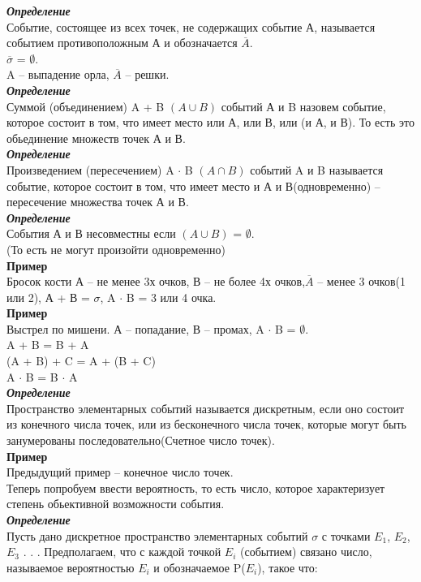 \documentclass[russian, 12pt]{article}
\begin{document}
\textit{\textbf{Определение}}\\ Событие, состоящее из всех точек, не содержащих событие А, называется событием противоположным А и обозначается $\overline{A}$.\\
$\overline{\sigma}$ = $\emptyset$.\\
A -- выпадение орла, $\overline{A}$ -- решки.\\
\textit{\textbf{Определение}}\\ Суммой (объединением)  A + B $(A \cup B)$ событий А и B назовем событие, которое состоит в том, что имеет место или А, или В, или (и А, и В). То есть это обьединение множеств точек А и В.\\
\textit{\textbf{Определение}}\\Произведением (пересечением) A $\cdot$ B $(A \cap B)$ событий A и B называется событие, которое состоит в том, что имеет место и А и В(одновременно) -- пересечение множества точек А и В.\\
\textit{\textbf{Определение}} \\События А и В несовместны если $(A \cup B)$ =  $\emptyset$.\\
(То есть не могут произойти одновременно)\\
\textbf{Пример\\}Бросок кости А -- не менее 3х очков, В -- не более 4х очков,$\overline{A}$ -- менее 3 очков(1 или 2), А + В = {$\sigma$}, A $\cdot$ B = 3 или 4 очка.\\
\textbf{Пример}\\Выстрел по мишени. А -- попадание, В -- промах,  A $\cdot$ B = $\emptyset$.\\
A + B = B + A\\
(A + B) + C = A + (B + C)\\
A $\cdot$ B = B  $\cdot$ A\\
\textit{\textbf{Определение}}\\Пространство элементарных событий называется дискретным, если оно состоит из конечного числа точек, или из бесконечного числа точек, которые могут быть занумерованы последовательно(Счетное число точек).\\
\textbf{Пример}\\Предыдущий пример -- конечное число точек.\\
Теперь попробуем ввести вероятность, то есть число, которое характеризует степень обьективной возможности события.\\
\textit{\textbf{Определение}}\\Пусть дано дискретное пространство элементарных событий {$\sigma$} с точками $E_{1}$, $E_{2}$, $E_{3}$ . . .  Предполагаем, что с каждой точкой $E_{i}$ (событием) связано число, называемое вероятностью $E_{i}$ и обозначаемое P($E_{i}$), такое что:\\ 
\end{document}
